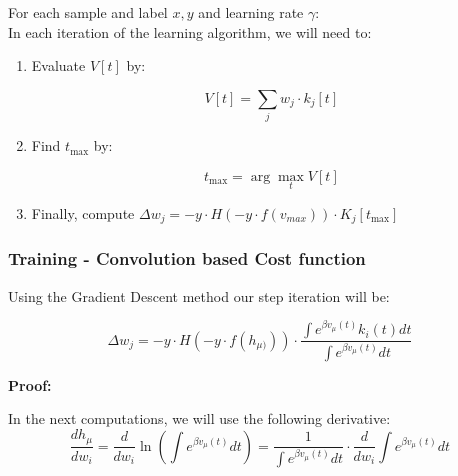 \begin{mdframed}[backgroundcolor=green_background, linecolor=black, linewidth=2pt, frametitle=\textbf{Pseudo-code}]

For each sample and label \(x, y\) and learning rate \(\gamma\): \\
In each iteration of the learning algorithm, we will need to:

\begin{enumerate}

    \item Evaluate $V[t]$ by: 

\begin{equation}
    V[t] = \sum_{j} w_j \cdot k_j[t]
\end{equation}

    \item Find $t_{\text{max}}$ by: 

\begin{equation}
    t_{\text{max}} = \arg\max_t V[t]
\end{equation}

    \item Finally, compute $\Delta w_j = -y \cdot H(-y \cdot f(v_{max})) \cdot K_j[t_{\text{max}}]$

\end{enumerate}
\end{mdframed}

\subsubsection{Training - Convolution based Cost function}


\begin{mdframed}[backgroundcolor=red_background, linecolor=black, linewidth=2pt, frametitle=\textbf{Statement}]
\begin{center}

    \label{st:GD-convl-medel}
    Using the Gradient Descent method our step iteration will be:

    \begin{equation}
        \Delta w_j = -y \cdot H(-y \cdot f(h_{\mu)})) \cdot \frac{\int e^{\beta v_{\mu}(t)} k_i(t) dt}{\int e^{\beta v_{\mu}(t)} dt}
    \end{equation}

\end{center}
\end{mdframed}

\textbf{Proof:}

In the next computations, we will use the following derivative:
\begin{equation}
    \frac{dh_{\mu}}{dw_i} = \frac{d}{dw_i}\ln\left(\int e^{\beta v_{\mu}(t)} dt\right) = \frac{1}{\int e^{\beta v_{\mu}(t)} dt} \cdot \frac{d}{dw_i}\int e^{\beta v_{\mu}(t)} dt
\end{equation}

